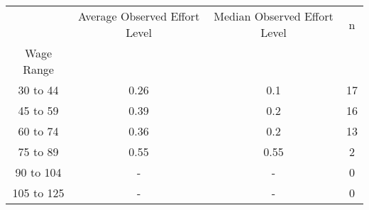\begin{tabular}{cccc}
\toprule
{} & Average Observed Effort Level & Median Observed Effort Level &   n \\
Wage Range &                               &                              &     \\
\midrule
30 to 44   &                          0.26 &                          0.1 &  17 \\
45 to 59   &                          0.39 &                          0.2 &  16 \\
60 to 74   &                          0.36 &                          0.2 &  13 \\
75 to 89   &                          0.55 &                         0.55 &   2 \\
90 to 104  &                             - &                            - &   0 \\
105 to 125 &                             - &                            - &   0 \\
\bottomrule
\end{tabular}
